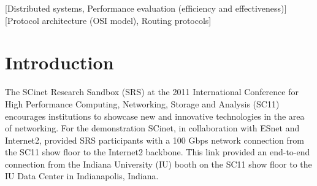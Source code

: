 \documentclass[]{sig-alternate}
\begin{document}
\begin{abstract}

  As part of the SCinet Research Sandbox at the 2011 International Conference for High Performance Computing,
  Networking, Storage and Analysis (SC11), Indiana University utilized a dedicated 100 Gbps wide area
  network (WAN) link spanning more than 3,500 km (2,175 mi) to demonstrate the capabilities of the Lustre high
  performance parallel file system in a high bandwidth, high latency WAN environment. This demonstration
  functioned as a proof of concept and provided an opportunity to study Lustre's performance over a 100 Gbps
  WAN. To characterize the performance of the network and file system, a series of benchmarks and tests were
  undertaken. These included low level iperf network tests, Lustre networking (LNET) tests, file system tests
  with the IOR benchmark, and a suite of real-world applications reading and writing to the file system. All
  of the benchmarks were run over a the WAN link with a latency of 50.5 ms. In this article, we
  describe the configuration and constraints of the demonstration, and focus on the key findings made regarding the Lustre networking layer for this extremely high bandwidth, high latency
  connection. Of particular interest is the relationship between the {\tt peer\_credits} and {\tt
    max\_rpcs\_in\_flight} settings when considering LNET performance.

\end{abstract}

[Distributed systems, Performance evaluation (efficiency and effectiveness)]
[Protocol architecture (OSI model),
Routing protocols]

\section{Introduction}\label{sec:intro}

The SCinet Research Sandbox (SRS) at the 2011 International Conference for High Performance Computing,
Networking, Storage and Analysis (SC11) encourages institutions to showcase new and innovative technologies in
the area of networking. For the demonstration SCinet, in collaboration with ESnet and Internet2, provided SRS
participants with a 100 Gbps network connection from the SC11 show floor to the Internet2 backbone. This link
provided an end-to-end connection from the Indiana University (IU) booth on the SC11 show floor to the IU Data
Center in Indianapolis, Indiana.
\end{document}
